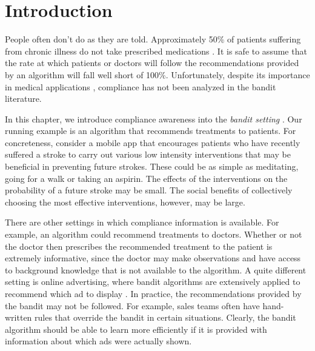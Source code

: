 \section{Introduction}
\label{bandintro}

People often don't do as they are told. Approximately 50\% of patients suffering from chronic illness do not take prescribed medications \cite{sabate:03}. It is safe to assume that the rate at which patients or doctors will follow the recommendations provided by an algorithm will fall well short of 100\%. 
Unfortunately, despite its importance in medical applications \cite{vrijens:12,hugtenburg:13}, compliance has not been analyzed in the bandit literature. 

In this chapter, we introduce compliance awareness into the \emph{bandit setting} \cite{bubeck:12}. %
Our running example is an algorithm that recommends treatments to patients. For concreteness, consider a mobile app that encourages patients who have recently suffered a stroke to carry out various low intensity interventions that may be beneficial in preventing future strokes.
These could be as simple as meditating, going for a walk or taking an aspirin.
The effects of the interventions on the probability of a future stroke may be small. The social benefits of collectively choosing the most effective interventions, however, may be large.
 
There are other settings in which compliance information is available. For example, an algorithm could recommend treatments to doctors. Whether or not the doctor then prescribes the recommended treatment to the patient is extremely informative, since the doctor may make observations and have access to background knowledge that is not available to the algorithm.
A quite different setting is online advertising, where bandit algorithms are extensively applied to recommend which ad to display \cite{graepel:10,mcmahan:13}. In practice, the recommendations provided by the bandit may not be followed. For example, sales teams often have hand-written rules that override the bandit in certain situations. %
Clearly, the bandit algorithm should be able to learn more efficiently if it is provided  with information about which ads were actually shown.

